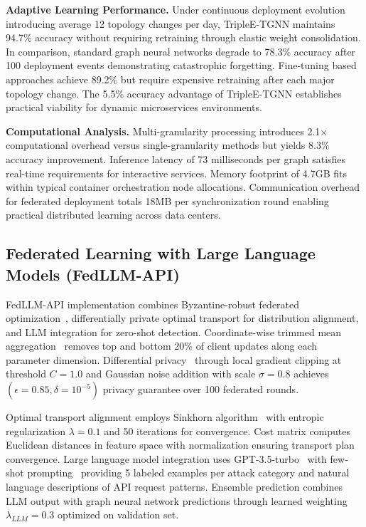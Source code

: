 \textbf{Adaptive Learning Performance.} Under continuous deployment evolution introducing average 12 topology changes per day, TripleE-TGNN maintains 94.7\% accuracy without requiring retraining through elastic weight consolidation. In comparison, standard graph neural networks degrade to 78.3\% accuracy after 100 deployment events demonstrating catastrophic forgetting. Fine-tuning based approaches achieve 89.2\% but require expensive retraining after each major topology change. The 5.5\% accuracy advantage of TripleE-TGNN establishes practical viability for dynamic microservices environments.

\textbf{Computational Analysis.} Multi-granularity processing introduces 2.1× computational overhead versus single-granularity methods but yields 8.3\% accuracy improvement. Inference latency of 73 milliseconds per graph satisfies real-time requirements for interactive services. Memory footprint of 4.7GB fits within typical container orchestration node allocations. Communication overhead for federated deployment totals 18MB per synchronization round enabling practical distributed learning across data centers.

\subsection{Federated Learning with Large Language Models (FedLLM-API)}

FedLLM-API implementation combines Byzantine-robust federated optimization~\cite{blanchard2017machine}, differentially private optimal transport for distribution alignment, and LLM integration for zero-shot detection. Coordinate-wise trimmed mean aggregation~\cite{yin2018byzantine} removes top and bottom 20\% of client updates along each parameter dimension. Differential privacy~\cite{dwork2006calibrating,abadi2016deep} through local gradient clipping at threshold $C = 1.0$ and Gaussian noise addition with scale $\sigma = 0.8$ achieves $(\epsilon = 0.85, \delta = 10^{-5})$ privacy guarantee over 100 federated rounds.

Optimal transport alignment employs Sinkhorn algorithm~\cite{cuturi2013sinkhorn} with entropic regularization $\lambda = 0.1$ and 50 iterations for convergence. Cost matrix computes Euclidean distances in feature space with normalization ensuring transport plan convergence. Large language model integration uses GPT-3.5-turbo~\cite{brown2020language} with few-shot prompting~\cite{brown2020language} providing 5 labeled examples per attack category and natural language descriptions of API request patterns. Ensemble prediction combines LLM output with graph neural network predictions through learned weighting $\lambda_{LLM} = 0.3$ optimized on validation set.

